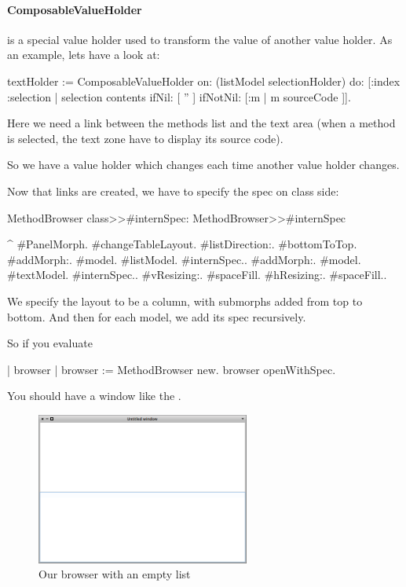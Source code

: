 \documentclass[a4paper,10pt,twoside]{book}
\begin{document}
\paragraph{ComposableValueHolder} is a special value holder used to transform the value of another value holder. As an example, lets have a look at: 
\begin{code}{}
textHolder := ComposableValueHolder on: (listModel selectionHolder) do: [:index :selection | selection contents 
		ifNil: [ '' ]
		ifNotNil: [:m | m sourceCode ]].
\end{code}

Here we need a link between the methods list and the text area (when a method is selected, the text zone have to display its source code).

So we have a value holder which changes each time another value holder changes.

Now that links are created, we have to specify the spec on class side:

\begin{method}{MethodBrowser class>>\#internSpec:}
MethodBrowser>>#internSpec

	^{ #PanelMorph.
			#changeTableLayout.
			#listDirection:. #bottomToTop.
			#addMorph:. {#model. #listModel. #internSpec.}.
			#addMorph:. {#model. #textModel. #internSpec.}.
			#vResizing:. #spaceFill.
			#hResizing:. #spaceFill.}.
\end{method}
We specify the layout to be a column, with submorphs added from top to bottom.
And then for each model, we add its spec recursively.

So if you evaluate
\begin{code}{}
| browser |
browser := MethodBrowser new.
browser openWithSpec.
\end{code}
You should have a window like the .
\begin{figure}[ht]
\begin{center}
	\includegraphics[width=7cm]{MethodBrowser1}
	\caption{Our browser with an empty list}
\end{center}
\end{figure}
\end{document}
